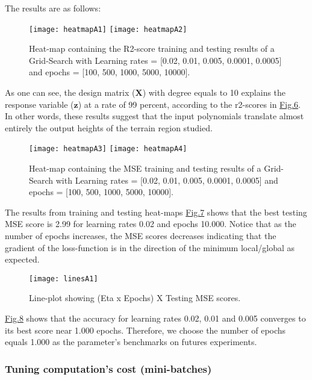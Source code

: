 The results are as follows:

\begin{figure}[H]
\label{fig:figA1}
\centering
\texttt{[image: heatmapA1]}
\texttt{[image: heatmapA2]}
\caption{Heat-map containing the R2-score training and testing results of a Grid-Search with Learning rates = [0.02, 0.01, 0.005, 0.0001, 0.0005] and epochs = [100, 500, 1000, 5000, 10000].}
\end{figure}

As one can see, the design matrix ($\boldsymbol{X}$) with degree equals to 10 explains the response variable ($\boldsymbol{z}$) at a rate of 99 percent, according to the r2-scores in \hyperref[fig:figA1]{Fig.6}. In other words, these results suggest that the input polynomials translate almost entirely the output heights of the terrain region studied.

\begin{figure}[H]
\label{fig:figA2}
\centering
\texttt{[image: heatmapA3]}
\texttt{[image: heatmapA4]}
\caption{Heat-map containing the MSE training and testing results of a Grid-Search with Learning rates = [0.02, 0.01, 0.005, 0.0001, 0.0005] and epochs = [100, 500, 1000, 5000, 10000]. }
\end{figure}

The results from training and testing heat-maps \hyperref[fig:fidA2]{Fig.7} shows that the best testing MSE score is 2.99 for learning rates 0.02 and epochs 10.000. Notice that as the number of epochs increases, the MSE scores decreases indicating that the gradient of the loss-function is in the direction of the minimum local/global as expected. 

\begin{figure}[H]
\label{fig:figA3}
\centering
\texttt{[image: linesA1]}
\caption{Line-plot showing (Eta x Epochs) X Testing MSE scores. }
\end{figure}

\hyperref[fig:figA3]{Fig.8} shows that the accuracy for learning rates 0.02, 0.01 and 0.005 converges to its best score near 1.000 epochs. Therefore, we choose the number of epochs equals 1.000 as the parameter's benchmarks on futures experiments.

\subsubsection{Tuning computation's cost (mini-batches)}
\label{chap:Tuning computation's cost (mini-batches)}

